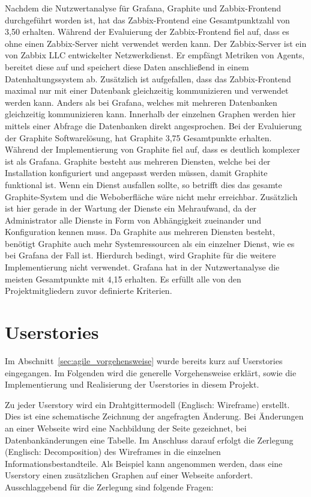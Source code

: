 Nachdem die Nutzwertanalyse für Grafana, Graphite und Zabbix-Frontend
durchgeführt worden ist, hat das Zabbix-Frontend eine Gesamtpunktzahl von 3,50
erhalten. Während der Evaluierung der Zabbix-Frontend fiel auf, dass es ohne
einen Zabbix-Server nicht verwendet werden kann. Der Zabbix-Server ist ein von
Zabbix LLC entwickelter Netzwerkdienst. Er empfängt Metriken von Agents,
bereitet diese auf und speichert diese Daten anschließend in einem
Datenhaltungssystem ab. Zusätzlich ist aufgefallen, dass das Zabbix-Frontend
maximal nur mit einer Datenbank gleichzeitig kommunizieren und verwendet werden
kann. Anders als bei Grafana, welches mit mehreren Datenbanken gleichzeitig
kommunizieren kann. Innerhalb der einzelnen Graphen werden hier mittels einer
Abfrage die Datenbanken direkt angesprochen. Bei der Evaluierung der Graphite
Softwarelösung, hat Graphite 3,75 Gesamtpunkte erhalten. Während der
Implementierung von Graphite fiel auf, dass es deutlich komplexer ist als
Grafana. Graphite besteht aus mehreren Diensten, welche bei der Installation
konfiguriert und angepasst werden müssen, damit Graphite funktional ist. Wenn
ein Dienst ausfallen sollte, so betrifft dies das gesamte Graphite-System und
die Weboberfläche wäre nicht mehr erreichbar. Zusätzlich ist hier gerade in der
Wartung der Dienste ein Mehraufwand, da der Administrator alle Dienste in Form
von Abhängigkeit zueinander und Konfiguration kennen muss. Da Graphite aus
mehreren Diensten besteht, benötigt Graphite auch mehr Systemressourcen als ein
einzelner Dienst, wie es bei Grafana der Fall ist. Hierdurch bedingt, wird
Graphite für die weitere Implementierung nicht verwendet. Grafana hat in der
Nutzwertanalyse die meisten Gesamtpunkte mit 4,15 erhalten. Es erfüllt alle von
den Projektmitgliedern zuvor definierte Kriterien.
\mr%

\chapter{Userstories}
Im Abschnitt~\ref{sec:agile_vorgehensweise} wurde bereits kurz auf Userstories
eingegangen. Im Folgenden wird die generelle Vorgehensweise erklärt, sowie die
Implementierung und Realisierung der Userstories in diesem Projekt.

Zu jeder Userstory wird ein Drahtgittermodell (Englisch: Wireframe) erstellt.
Dies ist eine schematische Zeichnung der angefragten Änderung. Bei Änderungen
an einer Webseite wird eine Nachbildung der Seite gezeichnet, bei
Datenbankänderungen eine Tabelle. Im Anschluss darauf erfolgt die Zerlegung
(Englisch: Decomposition) des Wireframes in die einzelnen
Informationsbestandteile. Als Beispiel kann angenommen werden, dass eine
Userstory einen zusätzlichen Graphen auf einer Webseite anfordert.
Ausschlaggebend für die Zerlegung sind folgende Fragen:

